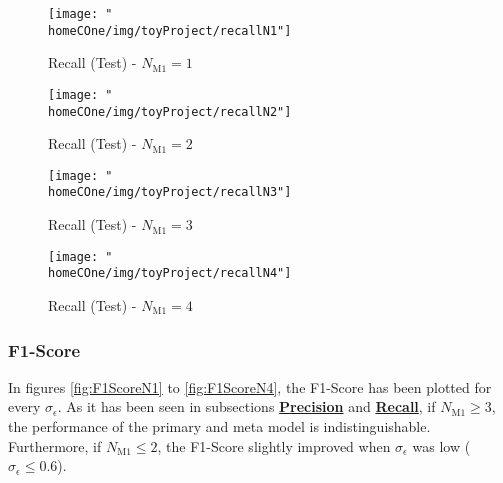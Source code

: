 \documentclass[a4paper]{report}
\newcommand{\homeCOne}{../../Chapter 1 - Metalabeling/Draft}
\begin{document}
\begin{figure}[htbp]
\centering
	\begin{minipage}{.5\textwidth}
	\centering
		\texttt{[image: "\\homeCOne/img/toyProject/recallN1"]}
	  	\caption{Recall (Test) - $N_{\text{M1}} = 1$}
	  	\label{fig:recallN1}
	\end{minipage}%
	\begin{minipage}{.5\textwidth}
	\centering
		\texttt{[image: "\\homeCOne/img/toyProject/recallN2"]}
		\caption{Recall (Test) - $N_{\text{M1}} = 2$}
		\label{fig:recallN2}
	\end{minipage}

	\vspace{.5cm}

	\begin{minipage}{.5\textwidth}
	\centering
		\texttt{[image: "\\homeCOne/img/toyProject/recallN3"]}
		\caption{Recall (Test) - $N_{\text{M1}} = 3$}
		\label{fig:recallN3}
	\end{minipage}%
	\begin{minipage}{.5\textwidth}
	\centering
		\texttt{[image: "\\homeCOne/img/toyProject/recallN4"]}
		\caption{Recall (Test) - $N_{\text{M1}} = 4$}
		\label{fig:recallN4}
	\end{minipage}
\end{figure}

\subsubsection{F1-Score}
\label{sec:toyProjectF1Score}
In figures \ref{fig:F1ScoreN1} to \ref{fig:F1ScoreN4}, the F1-Score has been 
plotted for every $\sigma_\epsilon$. As it has been seen in subsections
\hyperref[sec:toyProjectPrecision]{\textbf{Precision}} and 
\hyperref[sec:toyProjectRecall]{\textbf{Recall}}, if $N_{\text{M1}} \geq 3$, 
the performance of the primary and meta model is indistinguishable. 
Furthermore, if $N_{\text{M1}} \leq 2$, the F1-Score slightly improved when 
$\sigma_\epsilon$ was low ($\sigma_\epsilon \leq 0.6$).
\end{document}
